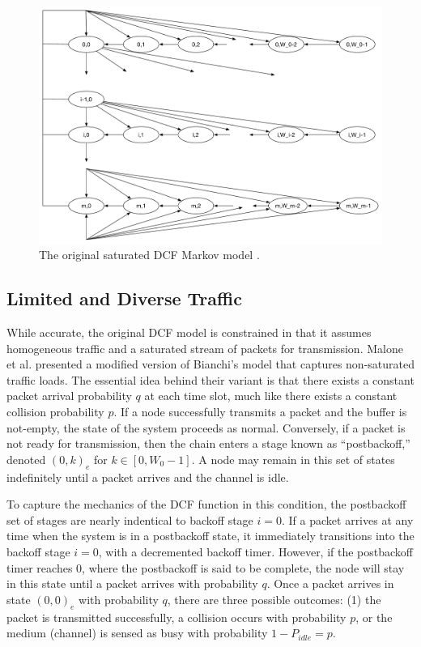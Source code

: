 \documentclass{llncs}
\begin{document}
\begin{figure}
\begin{center}
\includegraphics[scale=0.35]{../../sketches/dcf_model.pdf}
\caption{The original saturated DCF Markov model \cite{dcf}.}
\label{fig:dcf_model}
\end{center}
\end{figure}

\subsection{Limited and Diverse Traffic} \label{sec:nonsaturated}
While accurate, the original DCF model is constrained in that it assumes homogeneous traffic and a saturated stream of packets for transmission. Malone et al. \cite{dcf-nonsaturated} presented a modified version of Bianchi's model that captures non-saturated traffic loads. The essential idea behind their variant is that there exists a constant packet arrival probability $q$ at each time slot, much like there exists a constant collision probability $p$. If a node successfully transmits a packet and the buffer is not-empty, the state of the system proceeds as normal. Conversely, if a packet is not ready for transmission, then the chain enters a stage known as ``postbackoff,'' denoted $(0,k)_e$ for $k \in [0, W_0-1]$. A node may remain in this set of states indefinitely until a packet arrives and the channel is idle.

To capture the mechanics of the DCF function in this condition, the postbackoff set of stages are nearly indentical to backoff stage $i = 0$. If a packet arrives at any time when the system is in a postbackoff state, it immediately transitions into the backoff stage $i = 0$, with a decremented backoff timer. However, if the postbackoff timer reaches $0$, where the postbackoff is said to be complete, the node will stay in this state until a packet arrives with probability $q$. Once a packet arrives in state $(0, 0)_e$ with probability $q$, there are three possible outcomes: (1) the packet is transmitted successfully, a collision occurs with probability $p$, or the medium (channel) is sensed as busy with probability $1 - P_{idle} = p$. 
\end{document}
